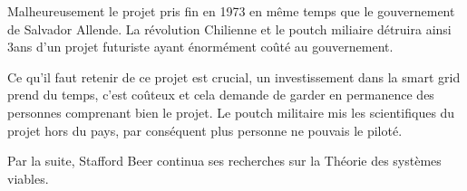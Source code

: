 Malheureusement le projet pris fin en 1973 en même temps que le gouvernement de Salvador Allende.
La révolution Chilienne et le poutch miliaire détruira ainsi 3ans d'un projet futuriste ayant
énormément coûté au gouvernement.

Ce qu'il faut retenir de ce projet est crucial, un investissement dans la smart grid prend du temps,
c'est coûteux et cela demande de garder en permanence des personnes comprenant bien le projet.
Le poutch militaire mis les scientifiques du projet hors du pays, par conséquent plus personne ne pouvais
le piloté.

Par la suite, Stafford Beer continua ses recherches sur la Théorie des systèmes viables.















